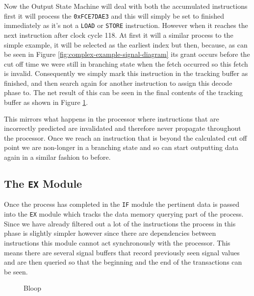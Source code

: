 Now the Output State Machine will deal with both the accumulated instructions first it will process the \texttt{0xFCE7DAE3} and this will simply be set to finished immediately as it's not a \texttt{LOAD} or \texttt{STORE} instruction. However when it reaches the next instruction after clock cycle 118. At first it will a similar process to the simple example, it will be selected as the earliest index but then, because, as can be seen in Figure \ref{fig:complex-example-signal-diagram} its grant occurs before the cut off time we were still in branching state when the fetch occurred so this fetch is invalid. Consequently we simply mark this instruction in the tracking buffer as finished, and then search again for another instruction to assign this decode phase to. The net result of this can be seen in the final contents of the tracking buffer as shown in Figure \ref{fig:complex-example-step-4}.

\begin{figure}[htbp]
	
	\caption{}
	\label{fig:complex-example-step-4}
\end{figure} 

This mirrors what happens in the processor where instructions that are incorrectly predicted are invalidated and therefore never propagate throughout the processor. Once we reach an instruction that is beyond the calculated cut off point we are non-longer in a branching state and so can start outputting data again in a similar fashion to before.

\subsection{The \texttt{EX} Module}

Once the process has completed in the \texttt{IF} module the pertinent data is passed into the \texttt{EX} module which tracks the data memory querying part of the process. Since we have already filtered out a lot of the instructions the process in this phase is slightly simpler however since there are dependencies between instructions this module cannot act synchronously with the processor. This means there are several signal buffers that record previously seen signal values and are then queried so that the beginning and the end of the transactions can be seen. 

\begin{figure}[htbp]
	
	\caption{Bloop}
	\label{fig:ex-state-machine}
\end{figure} 

